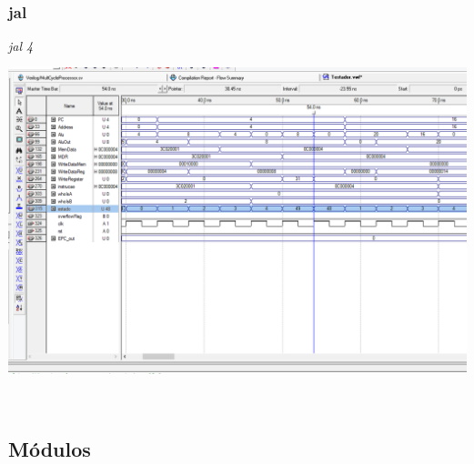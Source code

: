 \documentclass{article}
\begin{document}
    \\
    \subsubsection{jal}
    {\it jal 4}\\
    \begin{center}
        \includegraphics[scale=0.25]{jal.PNG}
    \end{center}
    
    \\
    \newpage
    \subsection{Módulos}
\end{document}
